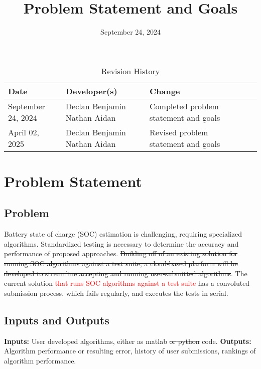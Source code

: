 \documentclass{article}
\title{Problem Statement and Goals\\\progname}
\author{\authname}
\date{September 24, 2024}
\begin{document}
\maketitle

\begin{table}[hp]
\caption{Revision History} \label{TblRevisionHistory}
\begin{tabularx}{\textwidth}{lp{2cm}lp{3cm}lp{6cm}}
\toprule
\textbf{Date} & \textbf{Developer(s)} & \textbf{Change}\\
\midrule
September 24, 2024 & Declan Benjamin Nathan Aidan & Completed problem statement and goals\\
April 02, 2025 & Declan Benjamin Nathan Aidan & Revised problem statement and goals\\
\bottomrule
\end{tabularx}
\end{table}

\section{Problem Statement}

\subsection{Problem}

Battery state of charge (SOC) estimation is challenging, requiring specialized algorithms. Standardized testing is necessary to determine the accuracy and performance of proposed approaches. \sout{Building off of an existing solution for running SOC algorithms against a test suite, a cloud-based platform will be developed to streamline accepting and running user-submitted algorithms}. The current solution \textcolor{red}{that runs SOC algorithms against a test suite} has a convoluted submission process, which fails regularly, and executes the tests in serial. 

\subsection{Inputs and Outputs}

\textbf{Inputs:} \newline
User developed algorithms, either as matlab \sout{or python} code. \newline \newline
\textbf{Outputs:} \newline
Algorithm performance or resulting error, history of user submissions, rankings of algorithm performance.
\end{document}
